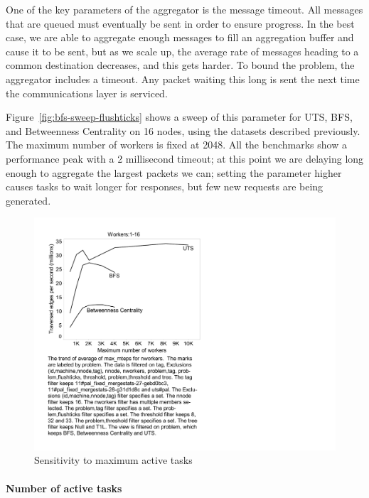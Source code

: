One of the key parameters of the aggregator is the message
timeout. All messages that are queued must eventually be sent in order
to ensure progress. In the best case, we are able to aggregate enough
messages to fill an aggregation buffer and cause it to be sent, but as
we scale up, the average rate of messages heading to a common
destination decreases, and this gets harder. To bound the problem, the
aggregator includes a timeout. Any packet waiting this long is sent
the next time the communications layer is serviced.

Figure~\ref{fig:bfs-sweep-flushticks} shows a sweep of this parameter
for UTS, BFS, and Betweenness Centrality on 16 nodes, using the
datasets described previously. The maximum number of workers is fixed
at 2048. All the benchmarks show a performance peak with a 2
millisecond timeout; at this point we are delaying long enough to
aggregate the largest packets we can; setting the parameter higher
causes tasks to wait longer for responses, but few new requests are
being generated.


\begin{figure}[htb]
\begin{center}
  \includegraphics[width=0.95\columnwidth]{figs/worker_sweep}
\begin{minipage}{0.95\columnwidth} 
  \caption{\label{fig:bfs-sweep-workers} Sensitivity to maximum active tasks}
\end{minipage}
\vspace{-3ex}
\end{center}
\end{figure}

\paragraph{Number of active tasks}


